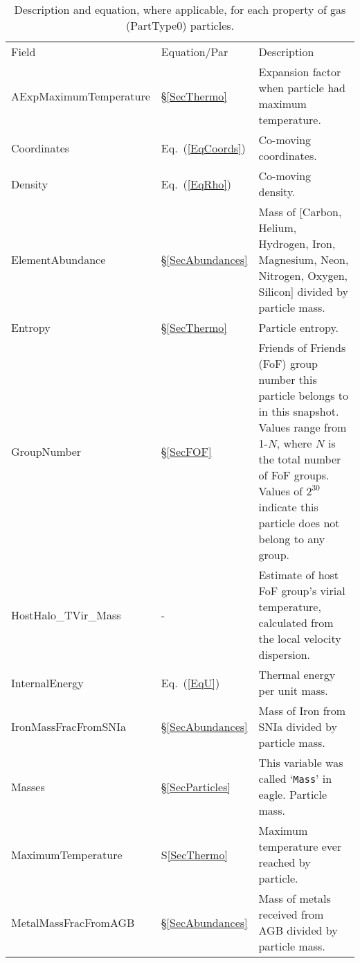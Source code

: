 \documentclass[10pt, a4paper]{article}
\newcommand{\groupnumber}{Friends of Friends (FoF) group number this particle
belongs to in this snapshot. Values range from 1-$N$, where $N$ is the total
number of FoF groups. Values of $2^{30}$ indicate this particle does not belong
to any group.}
\newcommand{\coordinates}{Co-moving coordinates.}
\newcommand{\eagle}{{\sc eagle}}
\begin{document}
\begin{table}
\label{TabGas}
\caption{Description and equation, where applicable, for each property of gas
(PartType0) particles.}
\begin{center}
\footnotesize
\renewcommand{\arraystretch}{1.5}
\begin{tabular}{>{\ttfamily}p{4cm}p{1.5cm}p{11cm}}
\multicolumn{3}{l}{\large \bf PartType0: Gas} \\
\hline
Field & Equation/Par & Description \\ \hline\hline

AExpMaximumTemperature &
\S\ref{SecThermo} &
Expansion factor when particle had maximum temperature. \\

Coordinates &
Eq.~(\ref{EqCoords}) &
\coordinates \\

Density &
Eq.~(\ref{EqRho}) &
Co-moving density. \\

ElementAbundance &
\S\ref{SecAbundances} &
Mass of [Carbon, Helium, Hydrogen, Iron, Magnesium, Neon, Nitrogen, Oxygen, Silicon] divided by particle mass. \\

Entropy &
\S\ref{SecThermo} &
Particle entropy. \\

GroupNumber & \S\ref{SecFOF} & \groupnumber \\

HostHalo\_TVir\_Mass &
- &
Estimate of host FoF group's virial temperature, calculated from the local velocity dispersion. \\

InternalEnergy &
Eq.~(\ref{EqU}) &
Thermal energy per unit mass. \\

IronMassFracFromSNIa &
\S\ref{SecAbundances} &
Mass of Iron from SNIa divided by particle mass. \\

Masses &
\S\ref{SecParticles} &
This variable was called `\texttt{Mass}' in \eagle. Particle mass.\\

MaximumTemperature &
S\ref{SecThermo} &
Maximum temperature ever reached by particle. \\

MetalMassFracFromAGB &
\S\ref{SecAbundances} &
Mass of metals received from AGB divided by particle mass. \\


\end{tabular}
\end{center}
\end{table}
\end{document}
